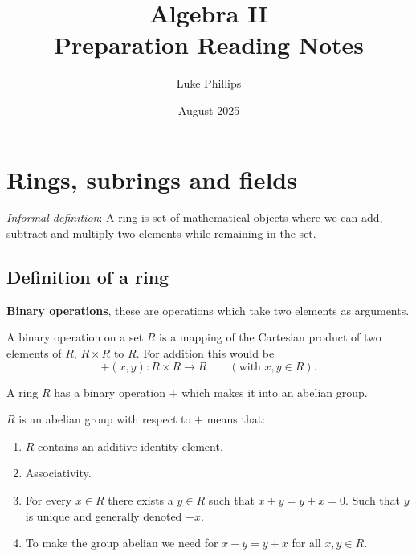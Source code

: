 \documentclass[10pt, a4paper]{article}
\title{Algebra II \\
    \large Preparation Reading Notes}
\author{Luke Phillips}
\date{August 2025}
\begin{document}
\maketitle

\newpage

\tableofcontents

\newpage

\section{Rings, subrings and fields}

\textit{Informal definition}:
A ring is set of mathematical objects where we can add,
subtract and multiply two elements while remaining in the set.

\subsection{Definition of a ring}
\textbf{Binary operations},
these are operations which take two elements as arguments.

A binary operation on a set $R$ is a mapping of the Cartesian product of two elements of $R$,
$R \times R$ to $R$.
For addition this would be
\[
+(x, y) : R \times R \to R\qquad(\text{with $x, y \in R$}).
\]

A ring $R$ has a binary operation $+$ which makes it into an abelian group.

$R$ is an abelian group with respect to $+$ means that:
\begin{enumerate}[label = \roman*)]
    \item $R$ contains an additive identity element.

    \item Associativity.

    \item For every $x \in R$ there exists a $y \in R$ such that $x + y = y + x = 0$.
    Such that $y$ is unique and generally denoted $-x$.

    \item To make the group abelian we need for $x + y = y + x$ for all $x, y \in R$.
\end{enumerate}
\end{document}
